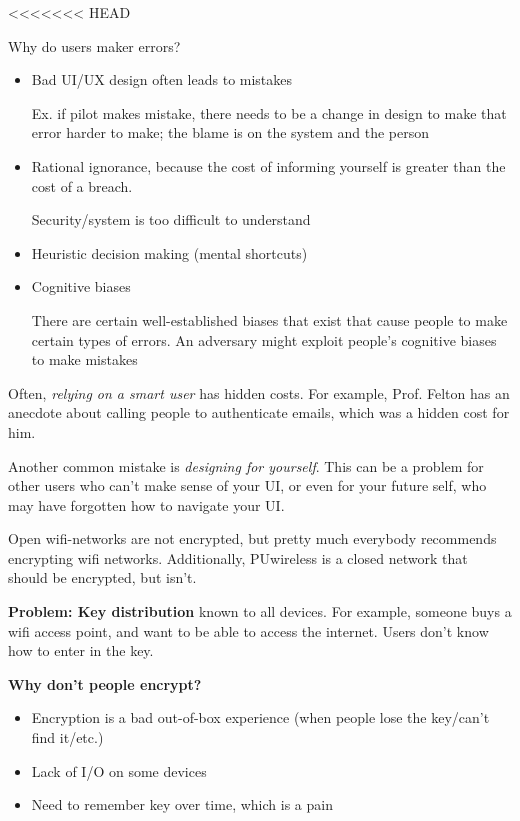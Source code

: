<<<<<<< HEAD

Why do users maker errors?
\begin{itemize}
	\item Bad UI/UX design often leads to mistakes

		Ex. if pilot makes mistake, there needs to be a change in design to make that error harder to make; the blame is on the system and the person
	\item Rational ignorance, because the cost of informing yourself is greater than 	the cost of a breach. 

		Security/system is too difficult to understand
	\item Heuristic decision making (mental shortcuts)
	\item Cognitive biases

		There are certain well-established biases that exist that cause people to make certain types of errors. An adversary might exploit people's cognitive biases to make mistakes
\end{itemize}

Often, \textit{relying on a smart user} has hidden costs. For example, Prof. Felton has an anecdote about calling people to authenticate emails, which was a hidden cost for him.

Another common mistake is \textit{designing for yourself}. This can be a problem for other users who can't make sense of your UI, or even for your future self, who may have forgotten how to navigate your UI.

Open wifi-networks are not encrypted, but pretty much everybody recommends encrypting wifi networks. Additionally, PUwireless is a closed network that should be encrypted, but isn't.

\textbf{Problem: Key distribution} known to all devices. For example, someone buys a wifi access point, and want to be able to access the internet. Users don't know how to enter in the key.

\textbf{Why don't people encrypt?}
\begin{itemize}
	\item Encryption is a bad out-of-box experience (when people lose the key/can't find it/etc.)
	\item Lack of I/O on some devices 
	\item Need to remember key over time, which is a pain
\end{itemize}

